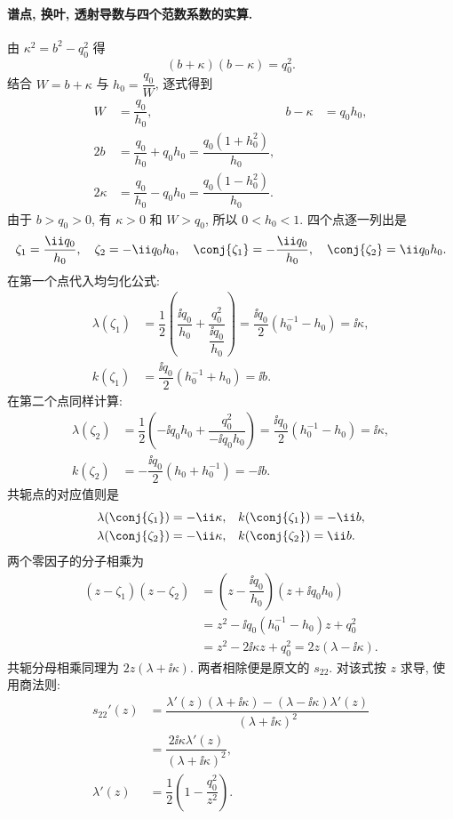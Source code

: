 \paragraph{谱点, 换叶, 透射导数与四个范数系数的实算.}
由 $\kappa^2=b^2-q_0^2$ 得
\[
(b+\kappa)(b-\kappa)=q_0^2.
\]
结合 $W=b+\kappa$ 与 $h_0=\dfrac{q_0}{W}$, 逐式得到
\[
\begin{aligned}
W&=\dfrac{q_0}{h_0},&
b-\kappa&=q_0h_0,\\
2b&=\dfrac{q_0}{h_0}+q_0h_0
=\dfrac{q_0(1+h_0^2)}{h_0},\\
2\kappa&=\dfrac{q_0}{h_0}-q_0h_0
=\dfrac{q_0(1-h_0^2)}{h_0}.
\end{aligned}
\]
由于 $b>q_0>0$, 有 $\kappa>0$ 和 $W>q_0$, 所以 $0<h_0<1$.
四个点逐一列出是
\[
\zeta_1=\dfrac{\ii q_0}{h_0},\quad
\zeta_2=-\ii q_0h_0,\quad
\conj{\zeta_1}=-\dfrac{\ii q_0}{h_0},\quad
\conj{\zeta_2}=\ii q_0h_0.
\]
在第一个点代入均匀化公式:
\[
\begin{aligned}
\lambda(\zeta_1)
&=\dfrac{1}{2}\left(\dfrac{\ii q_0}{h_0}
+\dfrac{q_0^2}{\dfrac{\ii q_0}{h_0}}\right)
=\dfrac{\ii q_0}{2}(h_0^{-1}-h_0)=\ii\kappa,\\
k(\zeta_1)
&=\dfrac{\ii q_0}{2}(h_0^{-1}+h_0)=\ii b.
\end{aligned}
\]
在第二个点同样计算:
\[
\begin{aligned}
\lambda(\zeta_2)
&=\dfrac{1}{2}\left(-\ii q_0h_0
+\dfrac{q_0^2}{-\ii q_0h_0}\right)
=\dfrac{\ii q_0}{2}(h_0^{-1}-h_0)=\ii\kappa,\\
k(\zeta_2)
&=-\dfrac{\ii q_0}{2}(h_0+h_0^{-1})=-\ii b.
\end{aligned}
\]
共轭点的对应值则是
\[
\begin{aligned}
\lambda(\conj{\zeta_1})&=-\ii\kappa,&
k(\conj{\zeta_1})&=-\ii b,\\
\lambda(\conj{\zeta_2})&=-\ii\kappa,&
k(\conj{\zeta_2})&=\ii b.
\end{aligned}
\]
两个零因子的分子相乘为
\[
\begin{aligned}
(z-\zeta_1)(z-\zeta_2)
&=\left(z-\dfrac{\ii q_0}{h_0}\right)
\left(z+\ii q_0h_0\right)\\
&=z^2-\ii q_0(h_0^{-1}-h_0)z+q_0^2\\
&=z^2-2\ii\kappa z+q_0^2
=2z(\lambda-\ii\kappa).
\end{aligned}
\]
共轭分母相乘同理为 $2z(\lambda+\ii\kappa)$.
两者相除便是原文的 $s_{22}$.
对该式按 $z$ 求导, 使用商法则:
\[
\begin{aligned}
s_{22}'(z)
&=\dfrac{\lambda'(z)(\lambda+\ii\kappa)
-(\lambda-\ii\kappa)\lambda'(z)}
{(\lambda+\ii\kappa)^2}\\
&=\dfrac{2\ii\kappa\lambda'(z)}
{(\lambda+\ii\kappa)^2},\\
\lambda'(z)&=\dfrac{1}{2}\left(1-\dfrac{q_0^2}{z^2}\right).
\end{aligned}
\]
